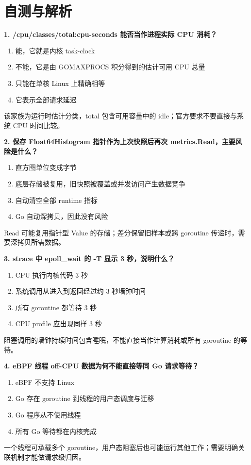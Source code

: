 \documentclass[UTF8,fontset=fandol,openany,11pt]{ctexbook}
\begin{document}
\section{自测与解析}
\noindent\textbf{1. /cpu/classes/total:cpu-seconds 能否当作进程实际 CPU 消耗？}
\begin{enumerate}[label=\Alph*.]
\item 能，它就是内核 task-clock
\item 不能，它是由 GOMAXPROCS 积分得到的估计可用 CPU 总量
\item 只能在单核 Linux 上精确相等
\item 它表示全部请求延迟
\end{enumerate}
该家族为运行时估计分类，total 包含可用容量中的 idle；官方要求不要直接与系统 CPU 时间比较。

\noindent\textbf{2. 保存 Float64Histogram 指针作为上次快照后再次 metrics.Read，主要风险是什么？}
\begin{enumerate}[label=\Alph*.]
\item 直方图单位变成字节
\item 底层存储被复用，旧快照被覆盖或并发访问产生数据竞争
\item 自动清空全部 runtime 指标
\item Go 自动深拷贝，因此没有风险
\end{enumerate}
Read 可能复用指针型 Value 的存储；差分保留旧样本或跨 goroutine 传递时，需要深拷贝所需数据。

\noindent\textbf{3. strace 中 epoll\_wait 的 -T 显示 3 秒，说明什么？}
\begin{enumerate}[label=\Alph*.]
\item CPU 执行内核代码 3 秒
\item 系统调用从进入到返回经过约 3 秒墙钟时间
\item 所有 goroutine 都等待 3 秒
\item CPU profile 应出现同样 3 秒
\end{enumerate}
阻塞调用的墙钟持续时间包含睡眠，不能直接当作计算消耗或所有 goroutine 的等待。

\noindent\textbf{4. eBPF 线程 off-CPU 数据为何不能直接等同 Go 请求等待？}
\begin{enumerate}[label=\Alph*.]
\item eBPF 不支持 Linux
\item Go 存在 goroutine 到线程的用户态调度与迁移
\item Go 程序从不使用线程
\item 所有 Go 等待都在内核完成
\end{enumerate}
一个线程可承载多个 goroutine，用户态阻塞后也可能运行其他工作；需要明确关联机制才能做请求级归因。
\end{document}
